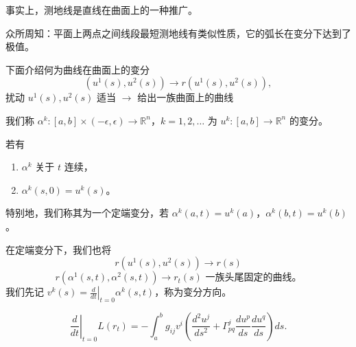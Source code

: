\documentclass[lang=cn,10pt,thmcnt=section]{elegantbook}
\begin{document}
事实上，测地线是直线在曲面上的一种推广。

众所周知：平面上两点之间线段最短测地线有类似性质，它的弧长在变分下达到了极值。

下面介绍何为曲线在曲面上的变分
\[
(u^1(s), u^2(s)) \longrightarrow r(u^1(s), u^2(s)),
\]
扰动 \( u^1(s), u^2(s) \) 适当 \(\longrightarrow\) 给出一族曲面上的曲线

\begin{definition}[曲线在曲面上的变分]
    我们称 $\alpha^k: [a, b] \times (-\epsilon, \epsilon) \rightarrow \mathbb{R}^n$，\(k = 1, 2, \ldots\) 为 $u^k: [a, b] \rightarrow \mathbb{R}^n$ 的变分。

    若有 
    \begin{enumerate}
        \item $\alpha^k$ 关于 $t$ 连续，
        \item $\alpha^k(s, 0) = u^k(s)$。
    \end{enumerate}
    
    特别地，我们称其为一个定端变分，若 $\alpha^k(a, t) = u^k(a)$，$\alpha^k(b, t) = u^k(b)$。
    

\end{definition}
在定端变分下，我们也将
\[
r(u^1(s), u^2(s)) \longrightarrow r(s)
\]
\[
r(\alpha^1(s, t), \alpha^2(s, t)) \longrightarrow r_t(s) \text{ 一族头尾固定的曲线。}
\]
我们先记 \( v^k(s) = \left. \frac{d}{dt} \right|_{t=0} \alpha^k(s, t) \)，称为变分方向。

\begin{proposition}[弧长变分公式]
\[
\left. \frac{d}{dt} \right|_{t=0} L(r_t) = -\int_a^b g_{ij} v^i \left( \frac{d^2 u^j}{ds^2} + \Gamma^j_{pq} \frac{du^p}{ds} \frac{du^q}{ds} \right) ds.
\]
\end{proposition}
\end{document}
